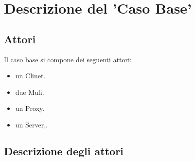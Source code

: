 \documentclass[13pt,a4paper]{article}
\begin{document}
	
	\section{Descrizione del 'Caso Base'}
	\subsection{Attori}
	Il caso base si compone dei seguenti attori: 
	\begin{itemize}
		\item un Clinet.
		\item due Muli.
		\item un Proxy.
		\item un Server,.
	\end{itemize}
	
	\subsection{Descrizione degli attori}
\end{document}
